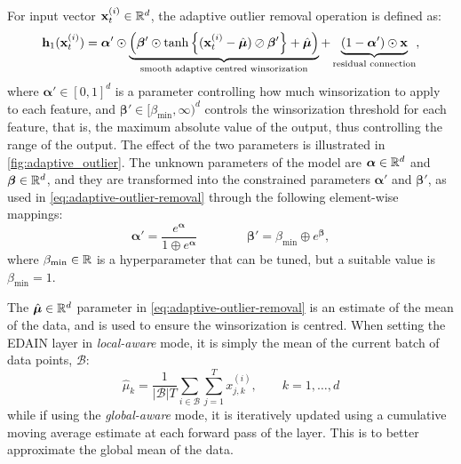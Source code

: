 \documentclass{statsmsc}
\begin{document}
For input vector $\mathbf{x}_t^{(i)} \in \mathbb{R}^d$, the adaptive outlier removal operation is defined as:
\begin{equation}\label{eq:adaptive-outlier-removal}
    \mathbf{h}_1(\mathbf{x}_t^{(i)})=\bm\alpha' \odot \underbrace{\left(\bm\beta' \odot
        \tanh\left\{(\mathbf{x}_t^{(i)}-\hat{\bm\mu}) \oslash \bm\beta'  \right\}+\hat{\bm\mu}
\right)}_{\text{smooth adaptive centred winsorization}}
    +\underbrace{\left(1-\bm\alpha' \right) \odot \mathbf{x}}_{\text{residual connection}},
\end{equation}
where
$\bm\alpha' \in [0,1]^d$ is a parameter controlling how much winsorization to apply to each feature,
and $\bm\beta' \in [\beta_{\text{min}},\infty)^d$ controls the winsorization threshold for
each feature, that is, the maximum absolute value of the output, thus controlling the range of the
output. The effect of the two parameters is illustrated in \cref{fig:adaptive_outlier}.
The unknown parameters of the model are $\bm\alpha \in \mathbb{R}^d$ and $\bm\beta \in \mathbb{R}^d$, and they
are transformed into the constrained parameters $\bm\alpha'$ and $\bm\beta'$, as used in
\cref{eq:adaptive-outlier-removal} through the following element-wise mappings:
\begin{equation}
    \bm\alpha'=\frac{e^{\bm\alpha}}{1\oplus e^{\bm\alpha}} \qquad\qquad
    \bm\beta'=\beta_{\text{min}}\oplus e^{\bm\beta},
\end{equation}
where $\beta_{\textrm{min}} \in \mathbb{R}$ is a hyperparameter that can be tuned, but a suitable value is $\beta_{\textrm{min}}=1$.


The $\hat{\bm\mu}\in \mathbb{R}^d$ parameter in \cref{eq:adaptive-outlier-removal} is an estimate of the mean of the data, and is used
to ensure the winsorization is centred. When setting the \ac{EDAIN} layer in \textit{local-aware}
mode, it is simply the mean of the current batch of data points, $\mathcal{B}$:
\begin{equation}
    \hat{\mu}_k=\frac{1}{|\mathcal{B}| T} \sum_{i \in \mathcal{B}} \sum_{j=1}^T x_{j,k}^{(i)}, \qquad k=1,\dots,d
\end{equation}
while if using the \textit{global-aware} mode, it is iteratively updated using a cumulative
moving average estimate at each forward pass of the layer. This is to better approximate the
global mean of the data.
\end{document}
